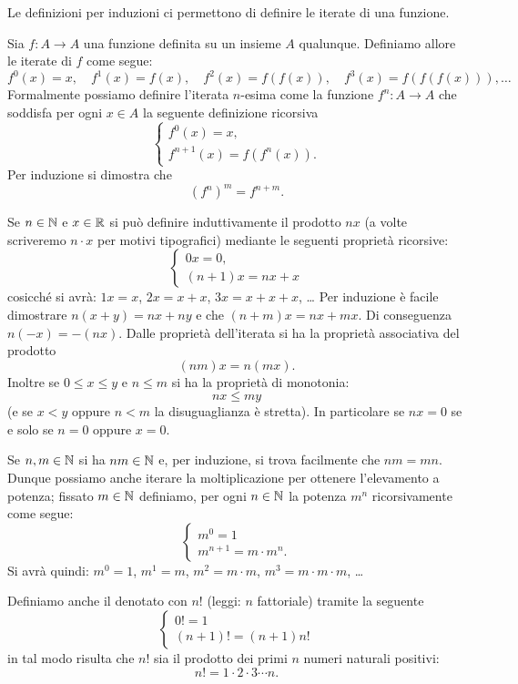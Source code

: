Le definizioni per induzioni ci permettono di definire le iterate di una funzione.

\begin{definition}[iterata]
  Sia $f\colon A \to A$ una funzione definita su un insieme $A$ qualunque.
  Definiamo allore le iterate di $f$ come segue:
  \[
    f^0(x) = x, \quad f^1(x) = f(x), \quad
    f^2(x) = f(f(x)), \quad f^3(x) = f(f(f(x))), \dots
  \]
  Formalmente possiamo definire l'iterata $n$-esima
  come la funzione $f^n\colon A \to A$ che soddisfa
  per ogni $x\in A$ la
  seguente definizione ricorsiva
  \[
    \begin{cases}
        f^0(x) = x,\\
        f^{n+1}(x) = f(f^n(x)).
    \end{cases}
  \]
  Per induzione si dimostra che 
  \begin{equation}\label{eq:570365}
    (f^n)^m = f^{n+m}.  
  \end{equation}
\end{definition}

Se $n\in \mathbb N$ e $x\in \mathbb R$ 
si può definire induttivamente il prodotto $n x$
(a volte scriveremo $n\cdot x$ per motivi tipografici)
mediante le seguenti proprietà ricorsive:
\[
\begin{cases}
   0 x = 0,\\
   (n+1) x = n x + x
\end{cases}
\]
cosicché si avrà: $1x = x$, $2x=x+x$, $3x=x+x+x$, \dots
Per induzione è facile dimostrare $n(x+y) = nx + ny$ 
e che $(n+m)x = nx + mx$. 
Di conseguenza $n(-x) = -(n x)$.
Dalle proprietà dell'iterata si ha la proprietà associativa del prodotto
\[
 (nm)x = n(mx).  
\]
Inoltre se 
$0 \le x \le y$ e $n \le m$ si ha la proprietà di monotonia:
\[
  n x \le m y
\]
(e se $x<y$ oppure $n<m$ la disuguaglianza è stretta).
In particolare se $n x = 0$ se e solo se $n=0$ oppure $x=0$.

Se $n,m\in \mathbb N$ si ha $nm\in \mathbb N$
e, per induzione, si trova facilmente che $nm = mn$.
Dunque possiamo anche iterare la moltiplicazione per ottenere l'elevamento 
a potenza;
fissato $m\in \mathbb N$ definiamo, per ogni $n\in \mathbb N$ la potenza $m^n$ 
ricorsivamente come segue:
\[
  \begin{cases}
    m^0 = 1 \\
    m^{n+1} = m \cdot m^n.
  \end{cases}
\]
Si avrà quindi: $m^0=1$, $m^1=m$, $m^2=m\cdot m$, $m^3=m\cdot m\cdot m$, \dots

Definiamo anche il 
%
%
denotato con $n!$ (leggi: $n$ fattoriale) 
tramite la seguente 
\[
  \begin{cases}
    0! = 1 \\
    (n+1)! = (n+1) n!
  \end{cases}
\]
in tal modo risulta che $n!$ sia il prodotto dei primi $n$ numeri naturali positivi:
\[
  n! = 1 \cdot 2 \cdot 3 \cdots n.  
\]

